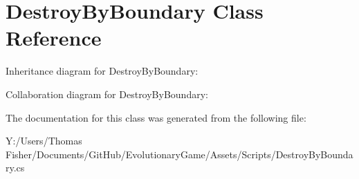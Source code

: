 \hypertarget{class_destroy_by_boundary}{}\section{Destroy\+By\+Boundary Class Reference}
\label{class_destroy_by_boundary}


Inheritance diagram for Destroy\+By\+Boundary\+:


Collaboration diagram for Destroy\+By\+Boundary\+:


The documentation for this class was generated from the following file\+:\begin{DoxyCompactItemize}
\item 
Y\+:/\+Users/\+Thomas Fisher/\+Documents/\+Git\+Hub/\+Evolutionary\+Game/\+Assets/\+Scripts/Destroy\+By\+Boundary.\+cs\end{DoxyCompactItemize}
